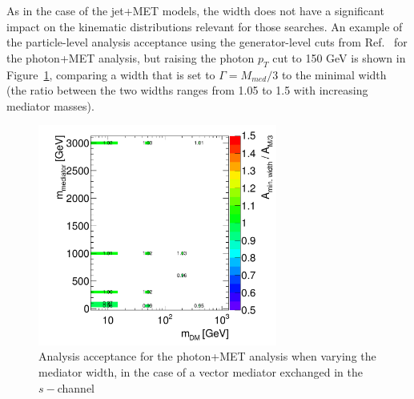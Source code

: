 
As in the case of the jet+MET models, the width does not have a significant
impact on the kinematic distributions relevant for those searches. An example
of the particle-level analysis acceptance using the
generator-level cuts from Ref.~\cite{Aad:2014tda}
for the photon+MET analysis, but raising the photon $p_T$ cut
to 150 GeV is shown in Figure~\ref{fig:DMV_EW_gamma_acceptance},
comparing a width that is set to $\Gamma=M_{med}/3$ to the
minimal width (the ratio between the two widths
ranges from 1.05 to 1.5 with increasing mediator masses).


\begin{figure}
    \includegraphics[width=0.7\textwidth]{figures/EW/acceptance_minwidth_vs_mo3_gamma}
    \caption{Analysis acceptance for the photon+MET analysis when varying the mediator width, in the
    case of a vector mediator exchanged in the $s-$channel}%
    \label{fig:DMV_EW_gamma_acceptance}
\end{figure}


